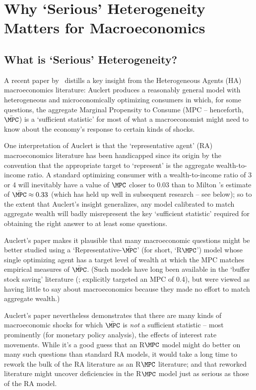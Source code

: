 \documentclass[titlepage]{econtex}
\begin{document}
\section{Why `Serious' Heterogeneity Matters for Macroeconomics}

\subsection{What is `Serious' Heterogeneity?}

A recent paper by~\cite{auclertMPC} distills a key insight from the Heterogeneous Agents (HA) macroeconomics literature:  Auclert produces a reasonably general model with heterogeneous and microconomically optimizing consumers in which, for some questions, the aggregate Marginal Propensity to Consume (MPC -- henceforth, $\bar{\MPC}$) is a `sufficient statistic' for most of what a macroeconomist might need to know about the economy's response to certain kinds of shocks.

One interpretation of Auclert is that the `representative agent' (RA) macroeconomics literature has been handicapped since its origin by the convention that the appropriate target to `represent' is the aggregate wealth-to-income ratio. A standard optimizing consumer with a wealth-to-income ratio of 3 or 4 will inevitably have a value of $\MPC$ closer to 0.03 than to Milton \cite{friedman:windfalls}'s estimate of $\bar{\MPC} \approx 0.33$ (which has held up well in subsequent research -- see below); so to the extent that Auclert's insight generalizes, any model calibrated to match aggregate wealth will badly misrepresent the key `sufficient statistic' required for obtaining the right answer to at least some questions.

Auclert's paper makes it plausible that many macroeconomic questions might be better studied using a `Representative-$\bar{\MPC}$' (for short, `R$\MPC$') model whose single optimizing agent has a target level of wealth at which the MPC matches empirical measures of $\bar{\MPC}$.  (Such models have long been available in the `buffer stock saving' literature (\cite{deatonLiqConstr}; \cite{carroll:bslcpih} explicitly targeted an MPC of 0.4), but were viewed as having little to say about macroeconomics because they made no effort to match aggregate wealth.)

Auclert's paper nevertheless demonstrates that there are many kinds of macroeconomic shocks for which $\bar{\MPC}$ is {\it not} a sufficient statistic -- most prominently (for monetary policy analysis), the effects of interest rate movements.  While it's a good guess that an R$\MPC$ model might do better on many such questions than standard RA models, it would take a long time to rework the bulk of the RA literature as an R$\MPC$ literature; and that reworked literature might uncover deficiencies in the R$\MPC$ model just as serious as those of the RA model.
\end{document}
